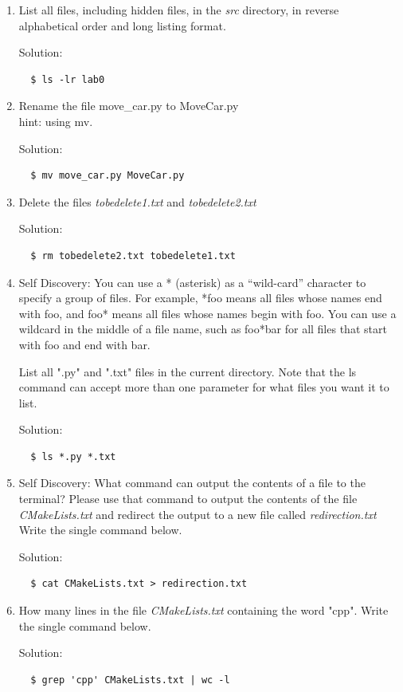 \documentclass[12pt]{article}
\begin{document}
\begin{enumerate}
\item List all files, including hidden files, in the \textit{src} directory, in reverse alphabetical order and long listing format.

Solution:

\begin{verbatim}
  $ ls -lr lab0
\end{verbatim}

\item Rename the file move\_car.py to MoveCar.py\\
hint: using mv.

Solution:

\begin{verbatim}
  $ mv move_car.py MoveCar.py
\end{verbatim}

\item Delete the files \textit{tobedelete1.txt} and \textit{tobedelete2.txt}

Solution: 

\begin{verbatim}
  $ rm tobedelete2.txt tobedelete1.txt
\end{verbatim}

\item Self Discovery: You can use a * (asterisk) as a “wild-card” character to specify a group of files. For example, *foo means all files whose names end with foo, and foo* means all files whose names begin with foo. You can use a wildcard in the middle of a file name, such as foo*bar for all files that start with foo and end with bar.

List all ".py" and ".txt" files in the current directory. Note that the ls command can accept more than one parameter for what files you want it to list.  

Solution:

\begin{verbatim}
  $ ls *.py *.txt
\end{verbatim}

\item Self Discovery: What command can output the contents of a file to the terminal? Please use that command to  output the contents of the file \textit{CMakeLists.txt} and redirect the output to a new file called \textit{redirection.txt} Write the single command below.

Solution:

\begin{verbatim}
  $ cat CMakeLists.txt > redirection.txt
\end{verbatim}

\item How many lines in the file \textit{CMakeLists.txt} containing the word "cpp". Write the single command below.

Solution: 

\begin{verbatim}
  $ grep 'cpp' CMakeLists.txt | wc -l
\end{verbatim}

\end{enumerate}
\end{document}
